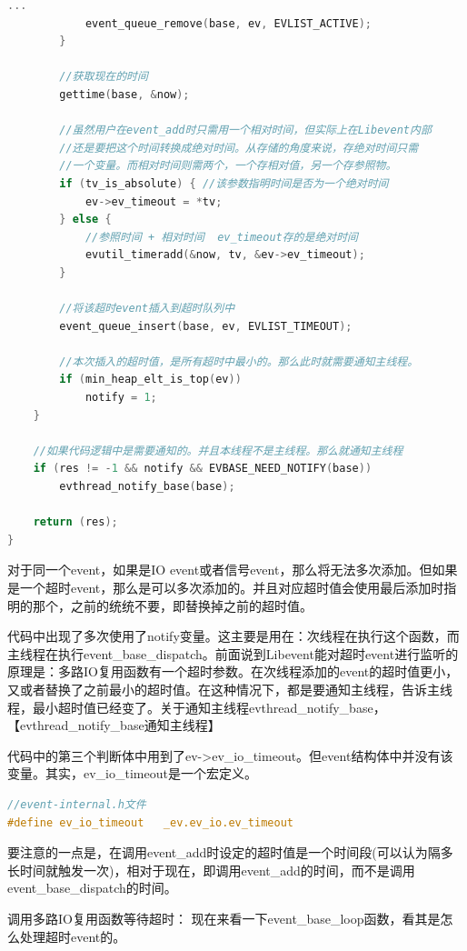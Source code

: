 \documentclass[11pt,a4paper]{article}
\begin{document}
\begin{lstlisting}[language=C]
			...
			event_queue_remove(base, ev, EVLIST_ACTIVE);
		}

		//获取现在的时间
		gettime(base, &now);

		//虽然用户在event_add时只需用一个相对时间，但实际上在Libevent内部
		//还是要把这个时间转换成绝对时间。从存储的角度来说，存绝对时间只需
		//一个变量。而相对时间则需两个，一个存相对值，另一个存参照物。
		if (tv_is_absolute) { //该参数指明时间是否为一个绝对时间
			ev->ev_timeout = *tv;
		} else {
			//参照时间 + 相对时间  ev_timeout存的是绝对时间
			evutil_timeradd(&now, tv, &ev->ev_timeout);
		}

		//将该超时event插入到超时队列中
		event_queue_insert(base, ev, EVLIST_TIMEOUT);

		//本次插入的超时值，是所有超时中最小的。那么此时就需要通知主线程。
		if (min_heap_elt_is_top(ev))
			notify = 1;
	}

	//如果代码逻辑中是需要通知的。并且本线程不是主线程。那么就通知主线程
	if (res != -1 && notify && EVBASE_NEED_NOTIFY(base))
		evthread_notify_base(base);

	return (res);
}
\end{lstlisting}
对于同一个event，如果是IO event或者信号event，那么将无法多次添加。但如果是一个超时event，那么是可以多次添加的。并且对应超时值会使用最后添加时指明的那个，之前的统统不要，即替换掉之前的超时值。

代码中出现了多次使用了notify变量。这主要是用在：次线程在执行这个函数，而主线程在执行event\_base\_dispatch。前面说到Libevent能对超时event进行监听的原理是：多路IO复用函数有一个超时参数。在次线程添加的event的超时值更小，又或者替换了之前最小的超时值。在这种情况下，都是要通知主线程，告诉主线程，最小超时值已经变了。关于通知主线程evthread\_notify\_base，【evthread\_notify\_base通知主线程】

代码中的第三个判断体中用到了ev->ev\_io\_timeout。但event结构体中并没有该变量。其实，ev\_io\_timeout是一个宏定义。
\begin{lstlisting}[language=C]
//event-internal.h文件
#define ev_io_timeout	_ev.ev_io.ev_timeout
\end{lstlisting}
要注意的一点是，在调用event\_add时设定的超时值是一个时间段(可以认为隔多长时间就触发一次)，相对于现在，即调用event\_add的时间，而不是调用event\_base\_dispatch的时间。

调用多路IO复用函数等待超时：
现在来看一下event\_base\_loop函数，看其是怎么处理超时event的。
        
\end{document}
